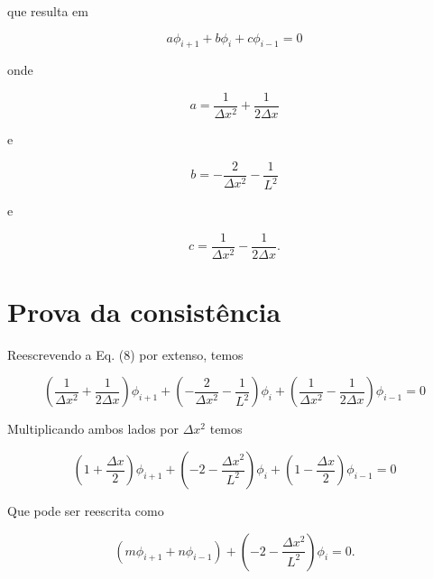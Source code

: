 \documentclass{article}
\begin{document}
        que resulta em
        
        \begin{equation}
            a \phi_{i+1} + b \phi_i + c \phi_{i-1} = 0
        \end{equation}
        
        onde
        
        \begin{equation}
            a = \frac{1}{\Delta x^2} + \frac{1}{2 \Delta x}
        \end{equation}
        
        e
        
        \begin{equation}
            b = -\frac{2}{\Delta x^2} - \frac{1}{L^2}
        \end{equation}
        
        e
        
        \begin{equation}
            c = \frac{1}{\Delta x^2} - \frac{1}{2 \Delta x}.
        \end{equation}






     \section{Prova da consistência}

        Reescrevendo a Eq. (8) por extenso, temos
    
        \begin{equation}
              (  \frac{1}{\Delta x^2} + \frac{1}{2 \Delta x} )      \phi_{i+1} 
            + ( -\frac{2}{\Delta x^2} - \frac{1}{L^2} )             \phi_i 
            + (  \frac{1}{\Delta x^2} - \frac{1}{2 \Delta x} )      \phi_{i-1} = 0
        \end{equation}

        Multiplicando ambos lados por $\Delta x^2$ temos

        \begin{equation}
              (  1 + \frac{\Delta x  }{2} )      \phi_{i+1} 
            + ( -2 - \frac{\Delta x^2}{L^2} )    \phi_i 
            + (  1 - \frac{\Delta x  }{2} )      \phi_{i-1} = 0
        \end{equation}

        Que pode ser reescrita como

        \begin{equation}
            ( m \phi_{i+1} + n \phi_{i-1} )  + ( -2 - \frac{\Delta x^2}{L^2} ) \phi_i = 0.
        \end{equation}
\end{document}
